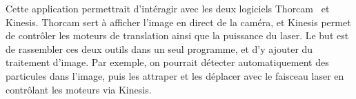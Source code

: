 Cette application permettrait d'intéragir avec les deux logiciels Thorcam~\cite{thorcamSoftware} et Kinesis. Thorcam sert à afficher l'image en direct de la caméra, et Kinesis permet de contrôler les moteurs de translation ainsi que la puissance du laser. Le but est de rassembler ces deux outils dans un seul programme, et d'y ajouter du traitement d'image. Par exemple, on pourrait détecter automatiquement des particules dans l'image, puis les attraper et les déplacer avec le faisceau laser en contrôlant les moteurs via Kinesis.




